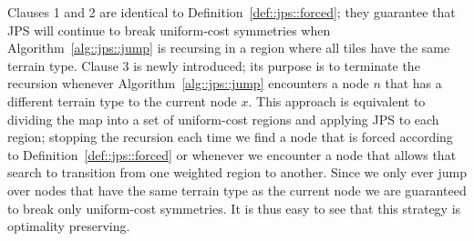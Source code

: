 Clauses 1 and 2 are identical to Definition~\ref{def::jps::forced}; they guarantee that JPS will continue 
to break uniform-cost symmetries when Algorithm~\ref{alg::jps::jump} is recursing in a region where all tiles
have the same terrain type. Clause 3 is newly introduced; its purpose is to terminate the recursion
whenever Algorithm~\ref{alg::jps::jump} encounters a node $n$ that has a different terrain type to the current
node $x$. This approach is equivalent to dividing the map into a set of uniform-cost 
regions and applying JPS to each region; stopping the recursion each time we find a node that is forced
according to Definition~\ref{def::jps::forced} or whenever we encounter a node that allows that search to 
transition from one weighted region to another. Since we only ever jump over nodes that have the same terrain 
type as the current node we are guaranteed to break only uniform-cost symmetries. It is thus easy to see that 
this strategy is optimality preserving. 
